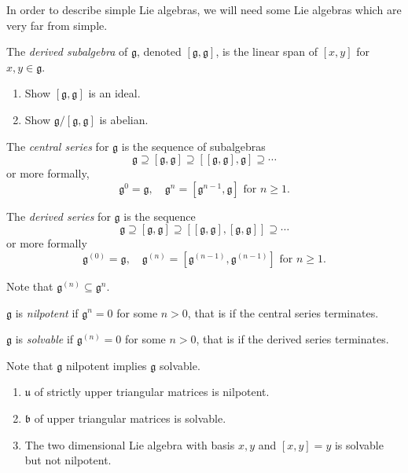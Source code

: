 \documentclass[a4paper]{article}
\newcommand*{\Lie}[1]{\mathfrak{#1}} %
\begin{document}
In order to describe simple Lie algebras, we will need some Lie algebras which are very far from simple.

\begin{definition}
  The \emph{derived subalgebra} of \(\Lie g\), denoted \([\Lie g, \Lie g]\), is the linear span of \([x, y]\) for \(x, y \in \Lie g\).
\end{definition}

\begin{ex}\leavevmode
  \begin{enumerate}
  \item Show \([\Lie g, \Lie g]\) is an ideal.
  \item Show \(\Lie g/[\Lie g, \Lie g]\) is abelian.
  \end{enumerate}
\end{ex}

\begin{definition}
  The \emph{central series} for \(\Lie g\) is the sequence of subalgebras
  \[
    \Lie g \supseteq [\Lie g, \Lie g] \supseteq [[\Lie g, \Lie g], \Lie g] \supseteq \cdots
  \]
  or more formally,
  \[
    \Lie g^0 = \Lie g, \quad \Lie g^n = [\Lie g^{n - 1}, \Lie g] \text{ for } n \geq 1.
  \]

  The \emph{derived series} for \(\Lie g\) is the sequence
   \[
    \Lie g \supseteq [\Lie g, \Lie g] \supseteq [[\Lie g, \Lie g], [\Lie g, \Lie g]] \supseteq \cdots
  \]
  or more formally
  \[
    \Lie g^{(0)} = \Lie g, \quad \Lie g^{(n)} = [\Lie g^{(n - 1)}, \Lie g^{(n - 1)}] \text{ for } n \geq 1.
  \]
\end{definition}

Note that \(\Lie g^{(n)} \subseteq \Lie g^n\).

\begin{definition}
  \(\Lie g\) is \emph{nilpotent} if \(\Lie g^n = 0\) for some \(n > 0\), that is if the central series terminates.

  \(\Lie g\) is \emph{solvable} if \(\Lie g^{(n)} = 0\) for some \(n > 0\), that is if the derived series terminates.
\end{definition}

Note that \(\Lie g\) nilpotent implies \(\Lie g\) solvable.

\begin{ex}\leavevmode
  \begin{enumerate}
  \item \(\Lie u\) of strictly upper triangular matrices is nilpotent.
  \item \(\Lie b\) of upper triangular matrices is solvable.
  \item The two dimensional Lie algebra with basis \(x, y\) and \([x, y] = y\) is solvable but not nilpotent.
  \end{enumerate}
\end{ex}
\end{document}
